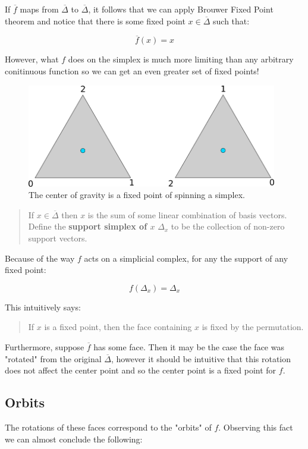 \documentclass[a4paper]{article}
\newcommand{\ol}{\overline}
\begin{document}
If $\ol{f}$ maps from $\ol{\Delta}$ to $\ol{\Delta}$, it follows that we can apply Brouwer Fixed Point theorem and notice that there is some fixed point $x \in \ol{\Delta}$ such that:

$$\ol{f}(x) = x$$

However, what $f$ does on the simplex is much more limiting than any arbitrary conitinuous function so we can get an even greater set of fixed points!

\begin{figure}
    \includegraphics[height=4.5cm]{rotate}
    \centering
    \caption{The center of gravity is a fixed point of spinning a simplex.}
\end{figure}

\begin{quote}
    If $x \in \ol{\Delta}$ then $x$ is the sum of some linear combination of basis vectors. Define the \textbf{support simplex of $x$} $\Delta_x$ to be the collection of non-zero support vectors.
\end{quote}

Because of the way $f$ acts on a simplicial complex, for any the support of any fixed point:

$$f(\Delta_{x}) = \Delta_x$$

This intuitively says:

\begin{quote}
    If $x$ is a fixed point, then the face containing $x$ is fixed by the permutation.
\end{quote}

Furthermore, suppose $\ol{f}$ has some face. Then it may be the case the face was "rotated" from the original $\ol{\Delta}$, however it should be intuitive that this rotation does not affect the center point and so the center point is a fixed point for $f$.

\subsection{Orbits}

The rotations of these faces correspond to the "orbits" of $f$. Observing this fact we can almost conclude the following:
\end{document}
